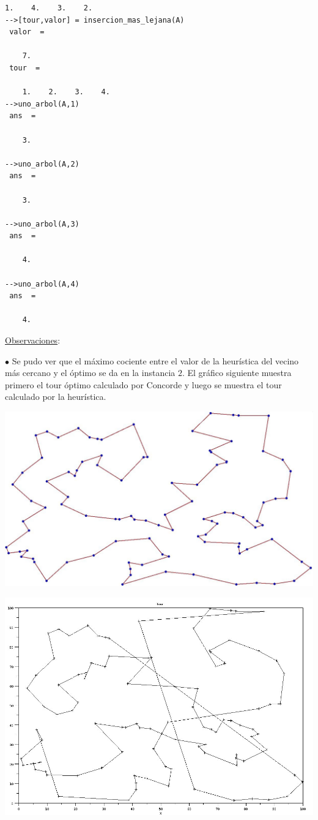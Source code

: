 \documentclass[10pt,a4paper]{report}
\begin{document}
\begin{enumerate}
\begin{lstlisting}[frame=single]
    1.    4.    3.    2.  
-->[tour,valor] = insercion_mas_lejana(A)
 valor  =
 
    7.  
 tour  =
 
    1.    2.    3.    4.
-->uno_arbol(A,1)
 ans  =
 
    3.  
 
-->uno_arbol(A,2)
 ans  =
 
    3.  
 
-->uno_arbol(A,3)
 ans  =
 
    4.  
 
-->uno_arbol(A,4)
 ans  =
 
    4.    
\end{lstlisting}
\end{enumerate}

\newpage
\setcounter{page}{5}
\begin{flushleft}
\underline{Observaciones}:\\
\end{flushleft}
$\bullet$ Se pudo ver que el m\'aximo cociente entre el valor de la heur\'istica del vecino m\'as cercano y el \'optimo se da en la instancia $2$. El gr\'afico siguiente muestra primero el tour \'optimo calculado por Concorde y luego se muestra el tour calculado por la heur\'istica. \\
\begin{center}
\includegraphics[scale=0.3]{instancia2TourOpt.jpg}
\end{center}
\begin{center}
\includegraphics[scale=0.4]{instancia2TourVMC.jpg}
\end{center}
\end{document}

